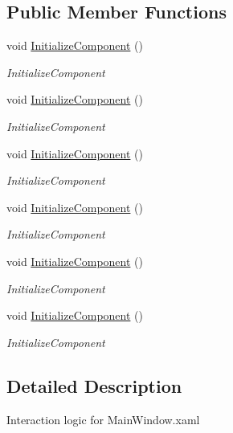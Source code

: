 \subsection*{Public Member Functions}
\begin{DoxyCompactItemize}
\item 
void \hyperlink{class_auto_sonography_w_p_f_1_1_main_window_a78046a04c327527f4db402722f7aea35}{Initialize\+Component} ()
\begin{DoxyCompactList}\small\item\em Initialize\+Component \end{DoxyCompactList}\item 
void \hyperlink{class_auto_sonography_w_p_f_1_1_main_window_a78046a04c327527f4db402722f7aea35}{Initialize\+Component} ()
\begin{DoxyCompactList}\small\item\em Initialize\+Component \end{DoxyCompactList}\item 
void \hyperlink{class_auto_sonography_w_p_f_1_1_main_window_a78046a04c327527f4db402722f7aea35}{Initialize\+Component} ()
\begin{DoxyCompactList}\small\item\em Initialize\+Component \end{DoxyCompactList}\item 
void \hyperlink{class_auto_sonography_w_p_f_1_1_main_window_a78046a04c327527f4db402722f7aea35}{Initialize\+Component} ()
\begin{DoxyCompactList}\small\item\em Initialize\+Component \end{DoxyCompactList}\item 
void \hyperlink{class_auto_sonography_w_p_f_1_1_main_window_a78046a04c327527f4db402722f7aea35}{Initialize\+Component} ()
\begin{DoxyCompactList}\small\item\em Initialize\+Component \end{DoxyCompactList}\item 
void \hyperlink{class_auto_sonography_w_p_f_1_1_main_window_a78046a04c327527f4db402722f7aea35}{Initialize\+Component} ()
\begin{DoxyCompactList}\small\item\em Initialize\+Component \end{DoxyCompactList}\end{DoxyCompactItemize}


\subsection{Detailed Description}
Interaction logic for Main\+Window.\+xaml 

